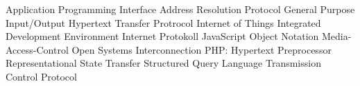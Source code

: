 \begin{acronym}[Bash]
  {Application Programming Interface}
  {Address Resolution Protocol}
  {General Purpose Input/Output}
  {Hypertext Transfer Protrocol}
  {Internet of Things}
  {Integrated Development Environment}
  {Internet Protokoll}
  {JavaScript Object Notation}
  {Media-Access-Control}
  {Open Systems Interconnection}
  {PHP: Hypertext Preprocessor}
  {Representational State Transfer}
  {Structured Query Language}
  {Transmission Control Protocol}
\end{acronym}
